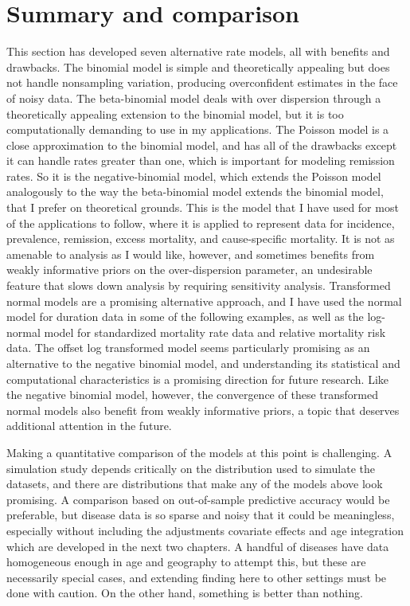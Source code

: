 \section{Summary and comparison}
This section has developed seven alternative rate models, all with
benefits and drawbacks.  The binomial model is simple and
theoretically appealing but does not handle nonsampling variation,
producing overconfident estimates in the face of noisy data.  The
beta-binomial model deals with over dispersion through a theoretically
appealing extension to the binomial model, but it is too
computationally demanding to use in my applications.  The Poisson
model is a close approximation to the binomial model, and has all of
the drawbacks except it can handle rates greater than one, which is
important for modeling remission rates.  So it is the
negative-binomial model, which extends the Poisson model analogously
to the way the beta-binomial model extends the binomial model, that I
prefer on theoretical grounds.  This is the model that I have used for
most of the applications to follow, where it is applied to represent
data for incidence, prevalence, remission, excess mortality, and
cause-specific mortality. It is not as amenable to analysis as I would
like, however, and sometimes benefits from weakly informative priors on
the over-dispersion parameter, an undesirable feature that slows down
analysis by requiring sensitivity analysis.  Transformed normal models
are a promising alternative approach, and I have used the normal model
for duration data in some of the following examples, as well as the
log-normal model for standardized mortality rate data and relative
mortality risk data. The offset log transformed model seems
particularly promising as an alternative to the negative binomial
model, and understanding its statistical and computational
characteristics is a promising direction for future research.  Like
the negative binomial model, however, the convergence of these
transformed normal models also benefit from weakly informative priors,
a topic that deserves additional attention in the future.

Making a quantitative comparison of the models at this point is
challenging.  A simulation study depends critically on the
distribution used to simulate the datasets, and there are
distributions that make any of the models above look promising.  A
comparison based on out-of-sample predictive accuracy would be
preferable, but disease data is so sparse and noisy that it could be
meaningless, especially without including the adjustments covariate
effects and age integration which are developed in the next two
chapters.  A handful of diseases have data homogeneous enough in age
and geography to attempt this, but these are necessarily special
cases, and extending finding here to other settings must be done with
caution.  On the other hand, something is better than nothing.

